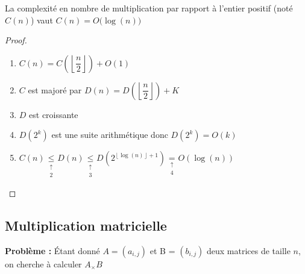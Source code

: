 \begin{proposition}[Complexité]
	La complexité en nombre de multiplication par rapport à l'entier positif (noté $C(n)$) vaut $C(n) = O\big(\log(n)\big)$
\end{proposition}

\begin{proof}
	\label{13-preuve}
	\begin{enumerate}
		\item $C(n) = C\left(\left\lfloor\dfrac{n}{2}\right\rfloor \right) + O(1)$
		\item $C$ est majoré par $D(n) = D\left(\left\lfloor\dfrac{n}{2}\right\rfloor\right) + K$
		\item $D$ est croissante
		\item $D\left(2^k\right)$ est une suite arithmétique donc $D\left(2^k\right) = O(k)$
		\item $C(n) \underset{\substack{\uparrow\\2}}\leq D(n) \underset{\substack{\uparrow\\3}}\leq D\left(2^{\left\lfloor\log(n)\right\rfloor+1}\right) \underset{\substack{\uparrow\\4}}= O(\log(n))$
	\end{enumerate}
\end{proof}

\subsection{Multiplication matricielle}

\textbf{Problème :} Étant donné $A = (a_{i,j})$ et B = $(b_{i,j})$ deux matrices de taille $n$, on cherche à calculer $A_\times B$


